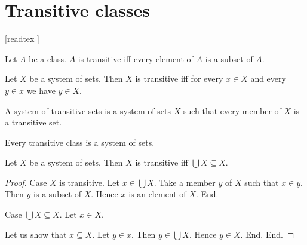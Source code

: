 \documentclass[../set-theory.tex]{subfiles}
\begin{document}
  \chapter{Transitive classes}


  \begin{forthel}

    [readtex ]

  \end{forthel}


  \begin{forthel}
    \begin{definition}\label{SET_THEORY_14_8167915266244608}
      Let $A$ be a class.
      $A$ is transitive iff every element of $A$ is a subset of $A$.
    \end{definition}
  \end{forthel}

  \begin{forthel}
    \begin{proposition}\label{SET_THEORY_14_6964770955591680}
      Let $X$ be a system of sets.
      Then $X$ is transitive iff for every $x \in X$ and every $y \in x$ we
      have $y \in X$.
    \end{proposition}
  \end{forthel}

  \begin{forthel}
    \begin{definition}\label{SET_THEORY_14_4219967964708864}
      A system of transitive sets is a system of sets $X$ such that every member
      of $X$ is a transitive set.
    \end{definition}
  \end{forthel}

  \begin{forthel}
    \begin{proposition}\label{SET_THEORY_14_2095807333400576}
      Every transitive class is a system of sets.
    \end{proposition}
  \end{forthel}

  \begin{forthel}
    \begin{proposition}\label{SET_THEORY_14_6524117649981440}
      Let $X$ be a system of sets.
      Then $X$ is transitive iff $\bigcup X \subseteq X$.
    \end{proposition}
    \begin{proof}
      Case $X$ is transitive.
        Let $x \in \bigcup X$.
        Take a member $y$ of $X$ such that $x \in y$.
        Then $y$ is a subset of $X$.
        Hence $x$ is an element of $X$.
      End.

      Case $\bigcup X \subseteq X$.
        Let $x \in X$.

        Let us show that $x \subseteq X$.
          Let $y \in x$.
          Then $y \in \bigcup X$.
          Hence $y \in X$.
        End.
      End.
    \end{proof}
  \end{forthel}
\end{document}
